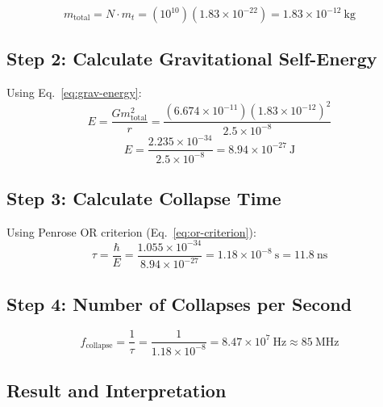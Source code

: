 \begin{equation}
m_{\text{total}} = N \cdot m_t = (10^{10})(1.83 \times 10^{-22}) = 1.83 \times 10^{-12}~\text{kg}
\end{equation}

\subsection*{Step 2: Calculate Gravitational Self-Energy}

Using Eq.~\ref{eq:grav-energy}:
\begin{equation}
E = \frac{G m_{\text{total}}^2}{r} = \frac{(6.674 \times 10^{-11})(1.83 \times 10^{-12})^2}{2.5 \times 10^{-8}}
\end{equation}
\begin{equation}
E = \frac{2.235 \times 10^{-34}}{2.5 \times 10^{-8}} = 8.94 \times 10^{-27}~\text{J}
\end{equation}

\subsection*{Step 3: Calculate Collapse Time}

Using Penrose OR criterion (Eq.~\ref{eq:or-criterion}):
\begin{equation}
\tau = \frac{\hbar}{E} = \frac{1.055 \times 10^{-34}}{8.94 \times 10^{-27}} = 1.18 \times 10^{-8}~\text{s} = 11.8~\text{ns}
\end{equation}

\subsection*{Step 4: Number of Collapses per Second}

\begin{equation}
f_{\text{collapse}} = \frac{1}{\tau} = \frac{1}{1.18 \times 10^{-8}} = 8.47 \times 10^{7}~\text{Hz} \approx 85~\text{MHz}
\end{equation}

\subsection*{Result and Interpretation}

